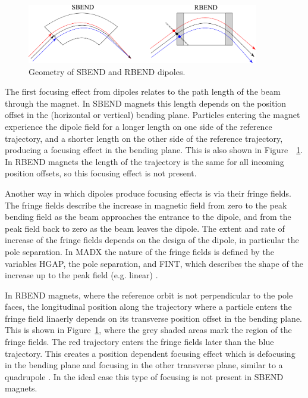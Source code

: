 \begin{figure}
  \centering
  \includegraphics[width=0.9\textwidth]{Figures/optics/sbendrbend}
  \caption{Geometry of SBEND and RBEND dipoles.}
  \label{f:sbendrbend}
\end{figure}

The first focusing effect from dipoles relates to the path length of the beam through the magnet. In SBEND magnets this length depends on the position offset in the (horizontal or vertical) bending plane. Particles entering the magnet experience the dipole field for a longer length on one side of the reference trajectory, and a shorter length on the other side of the reference trajectory, producing a focusing effect in the bending plane. This is also shown in Figure~~\ref{f:sbendrbend}. In RBEND magnets the length of the trajectory is the same for all incoming position offsets, so this focusing effect is not present.

Another way in which dipoles produce focusing effects is via their fringe fields. The fringe fields describe the increase in magnetic field from zero to the peak bending field as the beam approaches the entrance to the dipole, and from the peak field back to zero as the beam leaves the dipole. The extent and rate of increase of the fringe fields depends on the design of the dipole, in particular the pole separation. In MADX the nature of the fringe fields is defined by the variables HGAP, the pole separation, and FINT, which describes the shape of the increase up to the peak field (e.g. linear) \cite{madx}.

In RBEND magnets, where the reference orbit is not perpendicular to the pole faces, the longitudinal position along the trajectory where a particle enters the fringe field linaerly depends on its transverse position offset in the bending plane. This is shown in Figure~\ref{f:sbendrbend}, where the grey shaded areas mark the region of the fringe fields. The red trajectory enters the fringe fields later than the blue trajectory. This creates a position dependent focusing effect which is defocusing in the bending plane and focusing in the other transverse plane, similar to a quadrupole \cite{holzer}. In the ideal case this type of focusing is not present in SBEND magnets.

